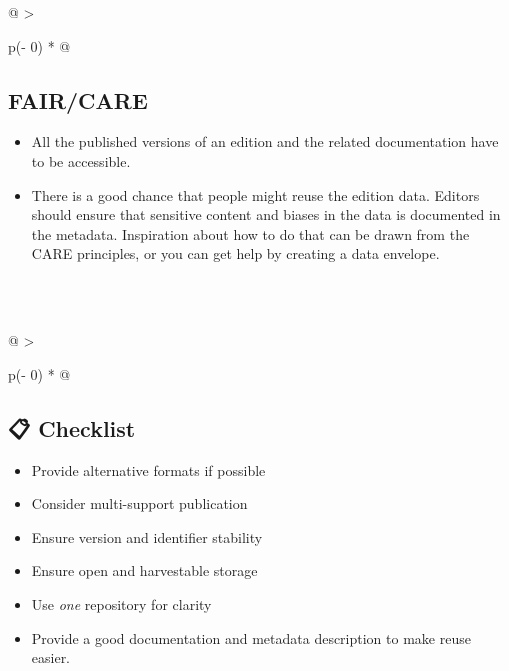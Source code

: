 \documentclass[
  letterpaper,
  DIV=11,
  numbers=noendperiod]{scrreprt}
\begin{document}
\begin{longtable}[]{@{}
  >{\raggedright\arraybackslash}p{(\columnwidth - 0\tabcolsep) * }@{}}
\toprule\noalign{}
\begin{minipage}[b]{\linewidth}\raggedright
\subsection*{\texorpdfstring{\textbf{FAIR/CARE}}{FAIR/CARE}}\label{faircare-ch05}

\begin{itemize}
\item
  All the published versions of an edition and the related documentation
  have to be accessible.
\item
  There is a good chance that people might reuse the edition data.
  Editors should ensure that sensitive content and biases in the data is
  documented in the metadata. Inspiration about how to do that can be
  drawn from the CARE principles, or you can get help by creating a data
  envelope.
\end{itemize}
\end{minipage} \\
\midrule\noalign{}
\endhead
\bottomrule\noalign{}
\endlastfoot
 \\
\end{longtable}

\begin{longtable}[]{@{}
  >{\raggedright\arraybackslash}p{(\columnwidth - 0\tabcolsep) * }@{}}
\toprule\noalign{}
\begin{minipage}[b]{\linewidth}\raggedright
\subsection*{\texorpdfstring{\textbf{📋
Checklist}}{📋 Checklist}}\label{checklist-ch05}

\begin{itemize}
\item
  Provide alternative formats if possible
\item
  Consider multi-support publication
\item
  Ensure version and identifier stability
\item
  Ensure open and harvestable storage
\item
  Use \emph{one} repository for clarity
\item
  Provide a good documentation and metadata description to make reuse
  easier.
\end{itemize}
\end{minipage} \\
\midrule\noalign{}
\endhead
\bottomrule\noalign{}
\endlastfoot
 \\
\end{longtable}
\end{document}
